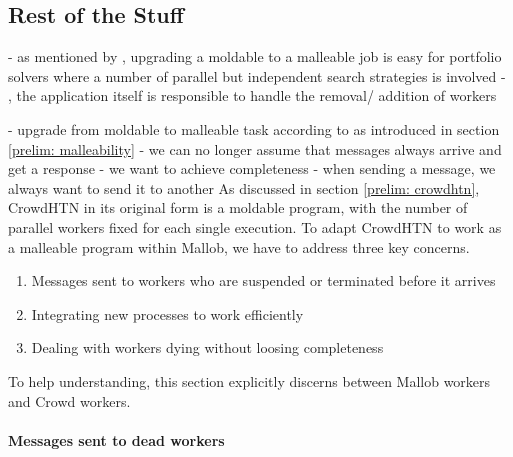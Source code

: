 \subsection{Rest of the Stuff}

- as mentioned by \cite{sanders2022decentralized}, upgrading a moldable to a malleable job is easy for portfolio solvers where a number of parallel but independent search strategies is involved
- \cite{sanders2022decentralized}, the application itself is responsible to handle the removal/ addition of workers

- upgrade from moldable to malleable task according to \cite{feitelson1997job} as introduced in section \ref{prelim: malleability}
- we can no longer assume that messages always arrive and get a response
- we want to achieve completeness
- when sending a message, we always want to send it to another 
As discussed in section \ref{prelim: crowdhtn}, CrowdHTN in its original form is a moldable program, with the number of parallel workers fixed for each single execution. To adapt CrowdHTN to work as a malleable program within Mallob, we have to address three key concerns.
\begin{enumerate}
	\item Messages sent to workers who are suspended or terminated before it arrives
	\item Integrating new processes to work efficiently
	\item Dealing with workers dying without loosing completeness
\end{enumerate}
To help understanding, this section explicitly discerns between Mallob workers and Crowd workers. 
\paragraph{Messages sent to dead workers}

